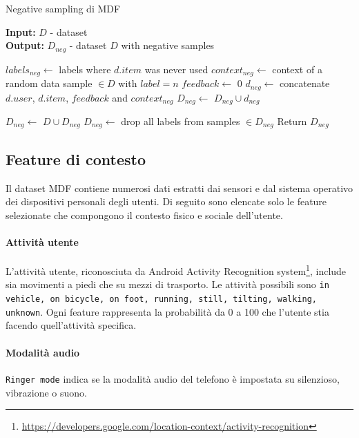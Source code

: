 \documentclass[12pt,italian]{report}
\begin{document}
\begin{algorithm}
\caption{Negative sampling di MDF}
\label{alg:neg-sampling}
 \hspace*{\algorithmicindent} \textbf{Input:} $D$ - dataset \\
 \hspace*{\algorithmicindent} \textbf{Output:} $D_{neg}$ - dataset 
$D$ with negative samples \\ 
\begin{algorithmic}[1]

	\STATE $labels_{neg} \leftarrow$ labels where $d.item$ was never used
		\STATE $context_{neg} \leftarrow$ context of a random data sample  $\in D$ with $label = n$
		\STATE $feedback \leftarrow$ 0
		\STATE $d_{neg} \leftarrow$ concatenate $d.user$, $d.item$, $feedback$ and $context_{neg}$
		\STATE $D_{neg} \leftarrow$ $D_{neg} \cup d_{neg}$ 
		
	\ENDFOR
\ENDFOR

\STATE $D_{neg} \leftarrow$ $D \cup D_{neg}$
\STATE $D_{neg} \leftarrow$ drop all labels from samples $ \in D_{neg}$
\STATE Return $D_{neg}$

\end{algorithmic}
\end{algorithm}


\subsection{Feature di contesto}
Il dataset MDF contiene numerosi dati estratti dai sensori e dal sistema operativo dei dispositivi personali degli utenti. Di seguito sono elencate solo le feature selezionate che compongono il contesto fisico e sociale dell'utente.

\paragraph{Attività utente}  L'attività utente, riconosciuta da
 Android Activity Recognition system\footnote{\url{https://developers.google.com/location-context/activity-recognition}},
include sia movimenti a piedi che su mezzi di trasporto. Le attività
possibili sono \texttt{in vehicle, on bicycle, on foot, running, still, tilting, walking, unknown}. Ogni feature rappresenta la probabilità da 0 a 100 che l'utente stia facendo quell'attività specifica.

\paragraph{Modalità audio} \texttt{Ringer mode} indica se la modalità audio del telefono è impostata su silenzioso, vibrazione o suono.
\end{document}
